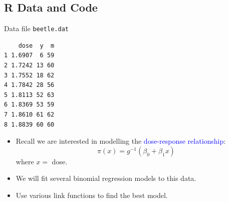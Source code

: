 \documentclass[oneside]{book}\usepackage[]{graphicx}\usepackage[svgnames]{xcolor}
\makeatletter
\newenvironment{kframe}{%
 \def\at@end@of@kframe{}%
 \ifinner\ifhmode%
  \def\at@end@of@kframe{\end{minipage}}%
  \begin{minipage}{\columnwidth}%
 \fi\fi%
 \def\FrameCommand##1{\hskip\@totalleftmargin \hskip-\fboxsep
 \colorbox{shadecolor}{##1}\hskip-\fboxsep
     \hskip-\linewidth \hskip-\@totalleftmargin \hskip\columnwidth}%
 \MakeFramed {\advance\hsize-\width
   \@totalleftmargin\z@ \linewidth\hsize
   \@setminipage}}%
 {\par\unskip\endMakeFramed%
 \at@end@of@kframe}
\newenvironment{knitrout}{}{} %
\makeatother
\begin{document}
\subsection*{R Data and Code}
\begin{Example}{Data file \texttt{beetle.dat}}
\begin{knitrout}
\color{fgcolor}\begin{kframe}
\begin{verbatim}
    dose  y  m
1 1.6907  6 59
2 1.7242 13 60
3 1.7552 18 62
4 1.7842 28 56
5 1.8113 52 63
6 1.8369 53 59
7 1.8610 61 62
8 1.8839 60 60
\end{verbatim}
\end{kframe}
\end{knitrout}
\end{Example}
\begin{itemize}
    \item Recall we are interested in modelling the \textcolor{Blue}{dose-response relationship}:
          \[ \pi(x)=g^{-1}(\beta_0+\beta_1x) \]
          where $ x= $ dose.
    \item We will fit several binomial regression
          models to this data.
    \item Use various link functions to find the best
          model.
\end{itemize}
\end{document}
